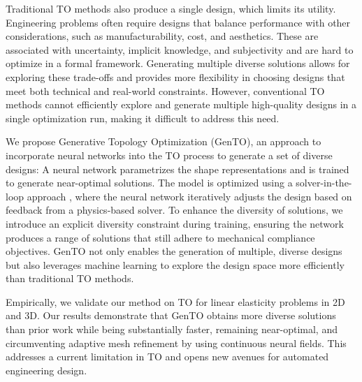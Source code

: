 Traditional TO methods also produce a single design, which limits its utility. 
Engineering problems often require designs that balance performance with other considerations, such as manufacturability, cost, and aesthetics. These are associated with uncertainty, implicit knowledge, and subjectivity and are hard to optimize in a formal framework.
Generating multiple diverse solutions allows for exploring these trade-offs and provides more flexibility in choosing designs that meet both technical and real-world constraints. 
However, conventional TO methods cannot efficiently explore and generate multiple high-quality designs in a single optimization run, making it difficult to address this need.

We propose Generative Topology Optimization (GenTO), an approach to incorporate neural networks into the TO process to generate a set of diverse designs: A neural network parametrizes the shape representations and is trained to generate near-optimal solutions. The model is optimized using a solver-in-the-loop approach \citep{2020solver_in_the_loop}, where the neural network iteratively adjusts the design based on feedback from a physics-based solver. To enhance the diversity of solutions, we introduce an explicit diversity constraint during training, ensuring the network produces a range of solutions that still adhere to mechanical compliance objectives. GenTO not only enables the generation of multiple, diverse designs but also leverages machine learning to explore the design space more efficiently than traditional TO methods. 
















Empirically, we validate our method on TO for linear elasticity problems in 2D and 3D. 
Our results demonstrate that GenTO obtains more diverse solutions than prior work while being substantially faster, remaining near-optimal, and circumventing adaptive mesh refinement by using continuous neural fields. 
This addresses a current limitation in TO and opens new avenues for automated engineering design. 




